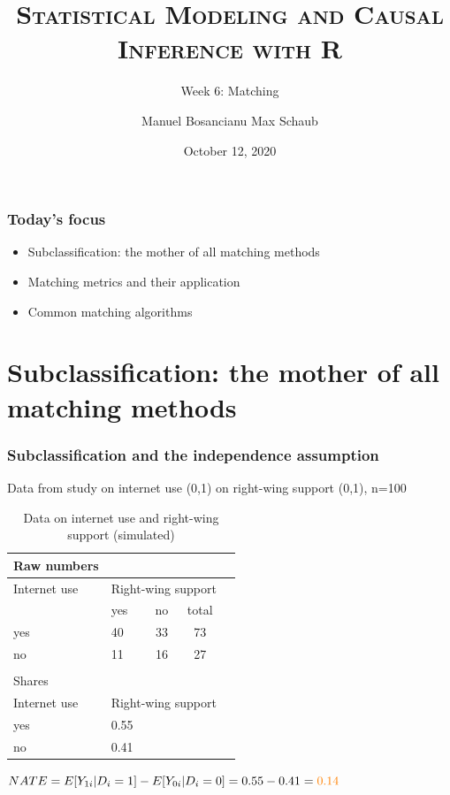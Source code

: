 \documentclass[12pt,english,dvipsnames,aspectratio=169,handout]{beamer}\usepackage[]{graphicx}\usepackage[]{xcolor}
\title{\textsc{Statistical Modeling and Causal Inference with R}}
\subtitle{Week 6: Matching}
\date{October 12, 2020}
\author{Manuel Bosancianu \hfill Max Schaub}
\institute{Hertie School of Governance}
\begin{document}
\maketitle


\begin{frame}
	\frametitle{Today's focus}
	\begin{itemize}
		\item Subclassification: the mother of all matching methods
		\item Matching metrics and their application
		\item Common matching algorithms
	\end{itemize}
\end{frame}


\section{Subclassification: the mother of all matching methods}


\begin{frame}
  \frametitle{Subclassification and the independence assumption}
\footnotesize
Data from study on internet use (0,1) on right-wing support (0,1), n=100


\tiny
\begin{table}\centering
\begin{tabular}{l*{1}{lccc}}
\toprule
Raw numbers                                  &         &         &         \\
\midrule
Internet use
                                             &\multicolumn{3}{c}{Right-wing support} \\
                                             &     yes&       no&      total    \\
yes                                          &      40&       33&         73     \\
no                                           &      11&       16&         27     \\
\hline
\hline
                                       &         &         &         \\
Shares                                 &         &         &         \\
\midrule
Internet use
                                             &\multicolumn{3}{c}{Right-wing support} \\
yes                                          &    0.55&           &             \\
no                                           &    0.41&           &             \\
\bottomrule
\end{tabular}
\caption{\scriptsize Data on internet use and right-wing support (simulated)}
\end{table}

\footnotesize
$NATE = E[Y_{1i}|D_i=1] - E[Y_{0i}|D_i=0] = 0.55-0.41 = \textcolor{orange}{0.14}$

\end{frame}
\end{document}
